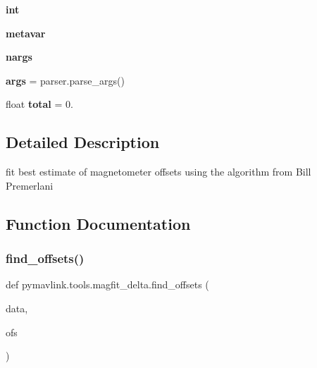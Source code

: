 \begin{DoxyCompactItemize}
\mbox{\label{namespacepymavlink_1_1tools_1_1magfit__delta_a71974d1f0536d5e2c5c9a3a7a9dae751}} 
{\bfseries int}
\item 
\mbox{\label{namespacepymavlink_1_1tools_1_1magfit__delta_a3d3d19061e2e11e1b90e027dc940cb04}} 
{\bfseries metavar}
\item 
\mbox{\label{namespacepymavlink_1_1tools_1_1magfit__delta_a3aa5f0f50b444c3585dcb7e6d98f692f}} 
{\bfseries nargs}
\item 
\mbox{\label{namespacepymavlink_1_1tools_1_1magfit__delta_a9726a4e5a788a983092e465fb17e912d}} 
{\bfseries args} = parser.\+parse\+\_\+args()
\item 
\mbox{\label{namespacepymavlink_1_1tools_1_1magfit__delta_a07322551a91ae5be6422fba4ec79f9cc}} 
float {\bfseries total} = 0.
\end{DoxyCompactItemize}


\subsection{Detailed Description}
\begin{DoxyVerb}fit best estimate of magnetometer offsets using the algorithm from
Bill Premerlani
\end{DoxyVerb}
 

\subsection{Function Documentation}
\mbox{\label{namespacepymavlink_1_1tools_1_1magfit__delta_a9ac6d8af876f202d906aadabe7c39e46}} 
\subsubsection{\texorpdfstring{find\+\_\+offsets()}{find\_offsets()}}
{\footnotesize\ttfamily def pymavlink.\+tools.\+magfit\+\_\+delta.\+find\+\_\+offsets (\begin{DoxyParamCaption}\item[{}]{data,  }\item[{}]{ofs }\end{DoxyParamCaption})}


